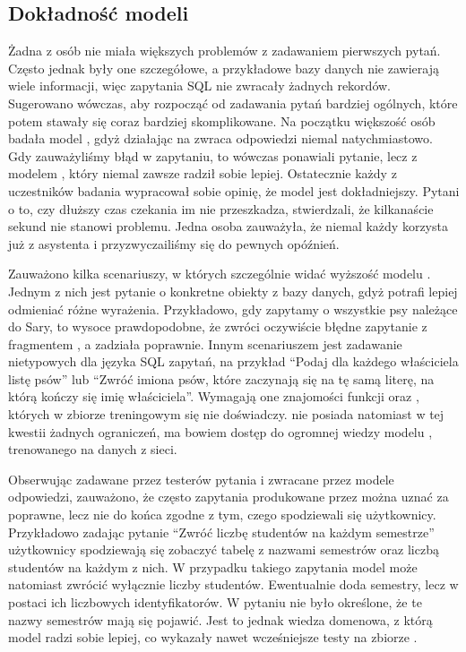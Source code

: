 \subsection{Dokładność modeli}
Żadna z osób nie miała większych problemów z zadawaniem pierwszych pytań. Często jednak były one szczegółowe, a przykładowe bazy danych nie zawierają wiele informacji, więc zapytania SQL nie zwracały żadnych rekordów. Sugerowano wówczas, aby rozpocząć od zadawania pytań bardziej ogólnych, które potem stawały się coraz bardziej skomplikowane. Na początku większość osób badała model , gdyż działając na  zwraca odpowiedzi niemal natychmiastowo. Gdy zauważyliśmy błąd w zapytaniu, to wówczas ponawiali pytanie, lecz z modelem , który niemal zawsze radził sobie lepiej. Ostatecznie każdy z uczestników badania wypracował sobie opinię, że model  jest dokładniejszy. Pytani o to, czy dłuższy czas czekania im nie przeszkadza, stwierdzali, że kilkanaście sekund nie stanowi problemu. Jedna osoba zauważyła, że niemal każdy korzysta już z asystenta   i przyzwyczailiśmy się do pewnych opóźnień.

Zauważono kilka scenariuszy, w których szczególnie widać wyższość modelu . Jednym z nich jest pytanie o konkretne obiekty z bazy danych, gdyż  potrafi lepiej odmieniać różne wyrażenia. Przykładowo, gdy zapytamy o wszystkie psy należące do Sary, to wysoce prawdopodobne, że  zwróci oczywiście błędne zapytanie z fragmentem , a  zadziała poprawnie. Innym scenariuszem jest zadawanie nietypowych dla języka SQL zapytań, na przykład \enquote{Podaj dla każdego właściciela listę psów} lub \enquote{Zwróć imiona psów, które zaczynają się na tę samą literę, na którą kończy się imię właściciela}. Wymagają one znajomości funkcji  oraz , których w zbiorze treningowym  się nie doświadczy.  nie posiada natomiast w tej kwestii żadnych ograniczeń, ma bowiem dostęp do ogromnej wiedzy modelu , trenowanego na danych z sieci.

Obserwując zadawane przez testerów pytania i zwracane przez modele odpowiedzi, zauważono, że często zapytania produkowane przez  można uznać za poprawne, lecz nie do końca zgodne z tym, czego spodziewali się użytkownicy. Przykładowo zadając pytanie \enquote{Zwróć liczbę studentów na każdym semestrze} użytkownicy spodziewają się zobaczyć tabelę z nazwami semestrów oraz liczbą studentów na każdym z nich. W przypadku takiego zapytania model może natomiast zwrócić wyłącznie liczby studentów. Ewentualnie doda semestry, lecz w postaci ich liczbowych identyfikatorów. W pytaniu nie było określone, że te nazwy semestrów mają się pojawić. Jest to jednak wiedza domenowa, z którą model  radzi sobie lepiej, co wykazały nawet wcześniejsze testy na zbiorze .

